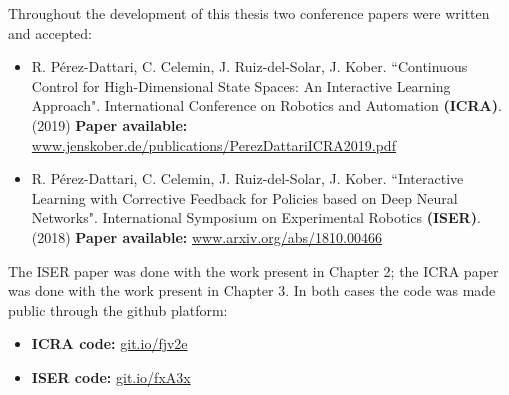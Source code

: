 \begin{publications}
Throughout the development of this thesis two conference papers were written and accepted:

\begin{itemize}
    \item R. Pérez-Dattari, C. Celemin, J. Ruiz-del-Solar, J. Kober. ``Continuous Control for High-Dimensional State Spaces: An Interactive Learning Approach". International Conference on Robotics and Automation \textbf{(ICRA)}. (2019)
    \newline\color{blue}\textbf{Paper available:} \color{black} \url{www.jenskober.de/publications/PerezDattariICRA2019.pdf}
    
    \vspace{0.5cm}
    
    \item R. Pérez-Dattari, C. Celemin, J. Ruiz-del-Solar, J. Kober. ``Interactive Learning with Corrective Feedback for Policies based on Deep Neural Networks". International Symposium on Experimental Robotics \textbf{(ISER)}. (2018)
    \newline\color{blue}\textbf{Paper available:} \color{black} \url{www.arxiv.org/abs/1810.00466}
\end{itemize}

The ISER paper was done with the work present in Chapter 2; the ICRA paper was done with the work present in Chapter 3. In both cases the code was made public through the github platform:

\begin{itemize}
    \item \textbf{ICRA code:} \url{git.io/fjv2e}
    
    \vspace{0.5cm}
    
    \item \textbf{ISER code:} \url{git.io/fxA3x}
\end{itemize}



\end{publications}